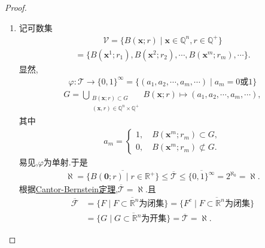 \documentclass[../../main.tex]{subfiles}%
\begin{document}
\begin{proof}
\begin{enumerate}[(1)]
\item 记可数集
\begin{align*}
\mathscr{V}=\{B(\boldsymbol{x};r)\mid \boldsymbol{x}\in\mathbb{Q}^n,r\in\mathbb{Q}^+\}
\end{align*}
\begin{align*}
=\{B(\boldsymbol{x}^1;r_1),B(\boldsymbol{x}^2;r_2),\cdots,B(\boldsymbol{x}^m;r_m),\cdots\}.
\end{align*}
显然,
\begin{align*}
\varphi:\mathscr{T}\to\{0,1\}^{\infty}=\{(a_1,a_2,\cdots,a_m,\cdots)\mid a_m=0\text{或}1\}
\end{align*}
\begin{align*}
G=\bigcup\limits_{\substack{B(\boldsymbol{x};r)\subset G\\ (\boldsymbol{x},r)\in\mathbb{Q}^n\times\mathbb{Q}^+}}B(\boldsymbol{x};r)\mapsto(a_1,a_2,\cdots,a_m,\cdots),
\end{align*}
其中
\begin{align*}
a_m=\begin{cases}
1,\quad B(\boldsymbol{x}^m;r_m)\subset G,\\
0,\quad B(\boldsymbol{x}^m;r_m)\not\subset G.
\end{cases}
\end{align*}
易见,$\varphi$为单射.于是
\begin{align*}
\aleph=\overline{\{B(\boldsymbol{0};r)\mid r\in\mathbb{R}^+\}}\leqslant\overline{\mathscr{T}}\leqslant\overline{\{0,1\}^{\infty}}=2^{\aleph_0}=\aleph.
\end{align*}
根据\hyperref[Set-Theory-theorem:Cantor-Bernstein定理]{Cantor-Bernstein定理},$\overline{\mathscr{T}}=\aleph$.且
\begin{align*}
\overline{\mathscr{F}}&=\overline{\{F\mid F\subset\mathbb{R}^n\text{为闭集}\}}=\overline{\{F^c\mid F\subset\mathbb{R}^n\text{为闭集}\}}
\\
&=\overline{\{G\mid G\subset\mathbb{R}^n\text{为开集}\}}=\overline{\mathscr{T}}=\aleph.
\end{align*}
\end{enumerate}

\end{proof}
\end{document}
